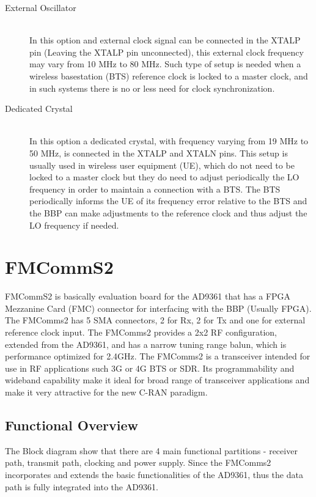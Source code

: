 \begin{description}
	\item[External Oscillator] \hfill \\
	In this option and external clock signal can be connected in the XTALP pin (Leaving the XTALP pin unconnected), this external clock frequency may vary from 10 MHz to 80 MHz. Such type of setup is needed when a wireless basestation (BTS) reference clock is locked to a master clock, and in such systems there is no or less need for clock synchronization.

	\item[Dedicated Crystal] \hfill \\
	In this option a dedicated crystal, with frequency varying from 19 MHz to 50 MHz, is connected in the XTALP and XTALN pins. This setup is usually used in wireless user equipment (UE), which do not need to be locked to a master clock but they do need to adjust periodically the LO frequency in order to maintain a connection with a BTS. The BTS periodically informs the UE of its frequency error relative to the BTS and the BBP can make adjustments to the reference clock and thus adjust the LO frequency if needed.

\end{description} 


\section{FMCommS2}

FMCommS2 is basically evaluation board for the AD9361 that has a FPGA Mezzanine Card (FMC) connector for interfacing with the BBP (Usually FPGA). The FMComms2 has 5 SMA connectors, 2 for Rx, 2 for Tx and one for external reference clock input. The FMComms2 provides a 2x2 RF configuration, extended from the AD9361, and has  a narrow tuning range balun, which is performance optimized for 2.4GHz.
The FMComms2 is a transceiver intended for use in RF applications such 3G or 4G BTS or SDR. Its programmability and wideband capability make it ideal for broad range of transceiver applications and make it very attractive for the new C-RAN paradigm.


\subsection{Functional Overview}

The Block diagram show that there are 4 main functional partitions - receiver path, transmit path, clocking and power supply. Since the FMComms2 incorporates and extends the basic functionalities of the AD9361, thus the data path is fully integrated into the AD9361.


